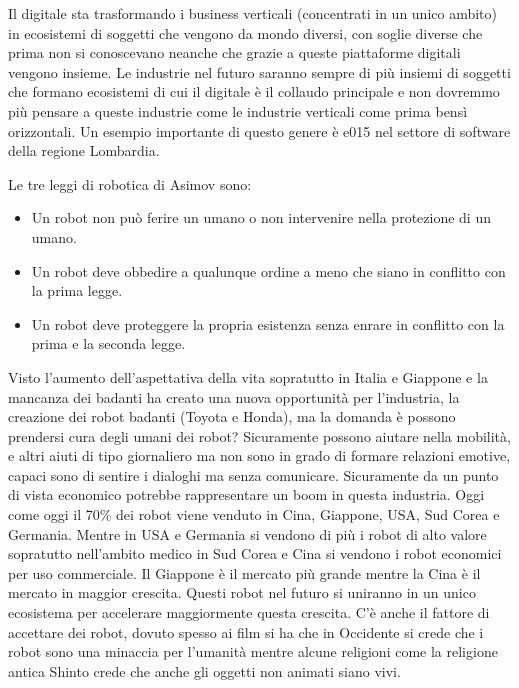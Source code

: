 \documentclass[]{article}
\begin{document}
Il digitale sta trasformando i business verticali (concentrati in un
unico ambito) in ecosistemi di soggetti che vengono da mondo diversi,
con soglie diverse che prima non si conoscevano neanche che grazie a
queste piattaforme digitali vengono insieme. Le industrie nel futuro
saranno sempre di più insiemi di soggetti che formano ecosistemi di cui
il digitale è il collaudo principale e non dovremmo più pensare a queste
industrie come le industrie verticali come prima bensì orizzontali. Un
esempio importante di questo genere è e015 nel settore di software della
regione Lombardia.

Le tre leggi di robotica di Asimov sono:

\begin{itemize}
	 
	\item
	Un robot non può ferire un umano o non intervenire nella protezione di
	un umano.
	\item
	Un robot deve obbedire a qualunque ordine a meno che siano in
	conflitto con la prima legge.
	\item
	Un robot deve proteggere la propria esistenza senza enrare in
	conflitto con la prima e la seconda legge.
\end{itemize}

Visto l'aumento dell'aspettativa della vita sopratutto in Italia e
Giappone e la mancanza dei badanti ha creato una nuova opportunità per
l'industria, la creazione dei robot badanti (Toyota e Honda), ma la
domanda è possono prendersi cura degli umani dei robot? Sicuramente
possono aiutare nella mobilità, e altri aiuti di tipo giornaliero ma non
sono in grado di formare relazioni emotive, capaci sono di sentire i
dialoghi ma senza comunicare. Sicuramente da un punto di vista economico
potrebbe rappresentare un boom in questa industria. Oggi come oggi il
70\% dei robot viene venduto in Cina, Giappone, USA, Sud Corea e
Germania. Mentre in USA e Germania si vendono di più i robot di alto
valore sopratutto nell'ambito medico in Sud Corea e Cina si vendono i
robot economici per uso commerciale. Il Giappone è il mercato più grande
mentre la Cina è il mercato in maggior crescita. Questi robot nel futuro
si uniranno in un unico ecosistema per accelerare maggiormente questa
crescita. C'è anche il fattore di accettare dei robot, dovuto spesso ai
film si ha che in Occidente si crede che i robot sono una minaccia per
l'umanità mentre alcune religioni come la religione antica Shinto crede
che anche gli oggetti non animati siano vivi.
\end{document}
